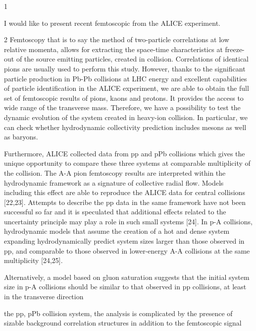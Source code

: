 1

I would like to present recent femtoscopic from the ALICE experiment.

2
Femtoscopy that is to say the method of two-particle correlations at low relative momenta, allows for extracting the space-time characteristics at freeze-out of the source emitting particles, created in collision.
Correlations of identical pions are usually used to perform this study. However, thanks to the significant particle production in Pb-Pb collisions at LHC energy  and excellent capabilities of particle identification in the ALICE experiment, we are able to obtain the full set of femtoscopic results of pions, kaons and protons.
It provides the access to wide range of the transverse mass. Therefore, we have a possibility to test the dynamic evolution of the system created in heavy-ion collision. In particular, we can check whether hydrodynamic collectivity prediction includes mesons as well as baryons.

Furthermore, ALICE collected data from pp and pPb collisions which gives the unique opportunity to compare these three systems at comparable multiplicity of the collision.
The A-A pion femtoscopy results are interpreted within the hydrodynamic framework as a signature of collective
radial flow. Models including this effect are able to reproduce
the ALICE data for central collisions [22,23]. Attempts
to describe the pp data in the same framework have not
been successful so far and it is speculated that additional
effects related to the uncertainty principle may play a role
in such small systems [24]. In p-A collisions, hydrodynamic
models that assume the creation of a hot and dense system
expanding hydrodynamically predict system sizes larger than
those observed in pp, and comparable to those observed in
lower-energy A-A collisions at the same multiplicity [24,25].

Alternatively, a model based on gluon saturation suggests
that the initial system size in p-A collisions should be similar
to that observed in pp collisions, at least in the transverse
direction

the pp, pPb collision system, the analysis is complicated by the presence of sizable background correlation structures in addition to the femtoscopic signal

